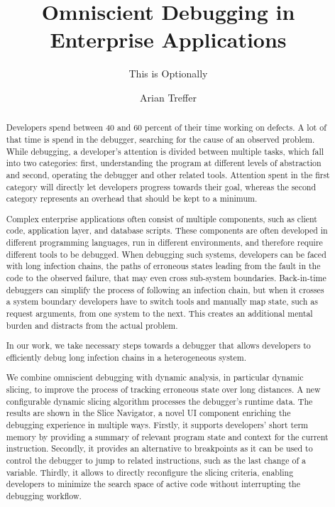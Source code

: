 \documentclass[
			en,
			phd,
			draft,
			garamond,
			12pt,
			]{sty/swathesis}
\author{Arian Treffer}
\title{Omniscient Debugging in Enterprise Applications}
\subtitle{This is Optionally}
\begin{document}
\frontmatter
\begin{otherlanguage}{german}
\maketitle
\end{otherlanguage}

\linenumbers

\begin{abstract}
Developers spend between 40 and 60 percent of their time working on defects.
A lot of that time is spend in the debugger, searching for the cause of an observed problem.
While debugging, a developer's attention is divided between multiple tasks, which fall into two categories:
first, understanding the program at different levels of abstraction and second, operating the debugger and other related tools.
Attention spent in the first category will directly let developers progress towards their goal, whereas the second category represents an overhead that should be kept to a minimum.

Complex enterprise applications often consist of multiple components, such as client code, application layer, and database scripts.
These components are often developed in different programming languages, run in different environments, and therefore require different tools to be debugged.
When debugging such systems, developers can be faced with long infection chains, the paths of erroneous states leading from the fault in the code to the observed failure, that may even cross sub-system boundaries.
Back-in-time debuggers can simplify the process of following an infection chain,
 but when it crosses a system boundary developers have to switch tools and manually map state, such as request arguments, from one system to the next.
This creates an additional mental burden and distracts from the actual problem.

In our work, we take necessary steps towards a debugger that allows developers to efficiently debug long infection chains in a heterogeneous system.

We combine omniscient debugging with dynamic analysis, in particular dynamic slicing, 
to improve the process of tracking erroneous state over long distances.
A new configurable dynamic slicing algorithm processes the debugger's runtime data.
The results are shown in the Slice Navigator, a novel UI component enriching the debugging
experience in multiple ways. Firstly, it supports developers’ short term memory
by providing a summary of relevant program state and context for the current
instruction. Secondly, it provides an alternative to breakpoints as it can be used
to control the debugger to jump to related instructions, such as the last change of
a variable. Thirdly, it allows to directly reconfigure the slicing criteria, enabling
developers to minimize the search space of active code without interrupting the
debugging workflow.


\end{abstract}
\end{document}

